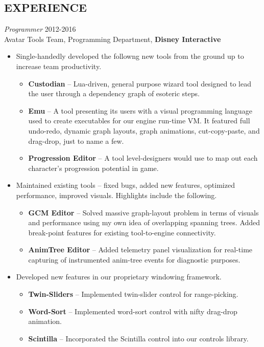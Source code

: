\documentclass[margin]{res}
\begin{document}
\begin{resume}
\section{EXPERIENCE} {\sl Programmer} \hfill 2012-2016 \\
		Avatar Tools Team, Programming Department, {\bf Disney Interactive}
		\begin{itemize}  \itemsep -2pt %
		\item Single-handedly developed the followng new tools from the ground up to increase team productivity.
			\begin{itemize}\itemsep -2pt %
			\item{\bf Custodian} -- Lua-driven, general purpose wizard tool designed to lead the user through a dependency graph of esoteric steps.
			\item{\bf Emu} -- A tool presenting its users with a visual programming language used to create executables for our engine run-time VM.  It featured full undo-redo, dynamic graph layouts, graph animations, cut-copy-paste, and drag-drop, just to name a few.
			\item{\bf Progression Editor} -- A tool level-designers would use to map out each character's progression potential in game.
			\end{itemize}
		\item Maintained existing tools -- fixed bugs, added new features, optimized performance, improved visuals.  Highlights include the following.
			\begin{itemize}\itemsep -2pt %
			\item{\bf GCM Editor} -- Solved massive graph-layout problem in terms of visuals and performance using my own idea of overlapping spanning trees.  Added break-point features for existing tool-to-engine connectivity.
			\item{\bf AnimTree Editor} -- Added telemetry panel visualization for real-time capturing of instrumented anim-tree events for diagnostic purposes.
			\end{itemize}
		\item Developed new features in our proprietary windowing framework.
			\begin{itemize}\itemsep -2pt %
			\item{\bf Twin-Sliders} -- Implemented twin-slider control for range-picking.
			\item{\bf Word-Sort} -- Implemented word-sort control with nifty drag-drop animation.
			\item{\bf Scintilla} -- Incorporated the Scintilla control into our controls library.
			\end{itemize}
                \end{itemize}
 

\end{resume}
\end{document}
